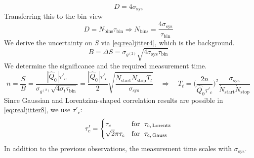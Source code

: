 \begin{equation}\label{eq:realjitter5}
	D=4\sigma_\mathrm{sys}
\end{equation}
Transferring this to the bin view
\begin{equation}\label{eq:realjitter6}
	D= N_\mathrm{bins}\tau_\mathrm{bin}\Rightarrow N_\mathrm{bins} =\dfrac{4\sigma_\mathrm{sys}}{\tau_\mathrm{bin}}
\end{equation}
We derive the uncertainty on $S$ via \cref{eq:realjitter4}, which is the background.
\begin{equation}\label{eq:realjitter7}
	B=\Delta S= \sigma_{g^{(2)}}\sqrt{4\sigma_\mathrm{sys} \tau_\mathrm{bin}}
\end{equation}
We determine the significance and the required measurement time.
\begin{equation}\label{eq:realjitter8}
	n=\dfrac{S}{B}=\dfrac{|\hat{Q}_0|\tau'_c}{\sigma_{g^{(2)}}\sqrt{4\sigma_t \tau_\mathrm{bin}}}=\dfrac{|\hat{Q}_0|\tau'_c}{2}\sqrt{\dfrac{\dot{N}_\mathrm{start}\dot{N}_\mathrm{stop}T_t}{\sigma_\mathrm{sys}}}\quad\Rightarrow\quad T_t=\Bigg(\dfrac{2n}{\hat{Q}_0\tau'_c}\Bigg)^2\dfrac{\sigma_\mathrm{sys}}{\dot{N}_\mathrm{start}\dot{N}_\mathrm{stop}}
\end{equation}
Since Gaussian and Lorentzian-shaped correlation results are possible in \cref{eq:realjitter8}, we use $\tau'_c$:
\begin{equation}\label{eq:realjitter9}
	\tau'_c=\begin{cases}
		\tau_c &\text{for \;}\tau_\mathrm{c,\, Lorentz}\\
		\sqrt{2}\pi\tau_c&\text{for \;}\tau_\mathrm{c,\, Gauss}
	\end{cases}
\end{equation}
In addition to the previous observations, the measurement time scales with $\sigma_\mathrm{sys}$.


